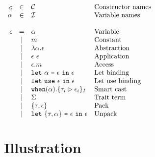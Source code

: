 \documentclass{article}[11pt]
\newcommand{\term}[1]{\verb~#1~}
\begin{document}
    \begin{math}
        \begin{array}{rclp{5cm}}
            \underline{c} & \in  & {\cal C}                                                                & Constructor names \\
            \alpha        & \in  & {\cal I}                                                                & Variable names    \\
            \\
            \epsilon & =
            & \alpha                                                                         & Variable              \\
            & \mid & m                                                                       & Constant              \\
            & \mid & \lambda \alpha . \epsilon                                               & Abstraction              \\
            & \mid & \epsilon ~ \epsilon                                                     & Application              \\
            & \mid & \epsilon . m                                                         & Access              \\
            & \mid & \term{let}~\alpha ~ \term{=} ~ \epsilon ~\term{in}~\epsilon             & Let~binding              \\
            & \mid & \term{let}~\term{use} ~ \epsilon ~\term{in}~\epsilon                    & Let~use~binding              \\
            & \mid & \term{when}(\alpha).\{ \tau_i \rhd \epsilon_i \}_I                      & Smart cast              \\
            & \mid & \Sigma                                                                  & Trait~term              \\
            & \mid & \{\tau, \epsilon\}                                                      & Pack              \\
            & \mid & \term{let} ~ \{\tau, \alpha\} ~ \term{=} ~ \epsilon ~\term{in}~\epsilon & Unpack               \\
        \end{array}
    \end{math}


    \section{Illustration}\label{sec:illustration}
\end{document}

